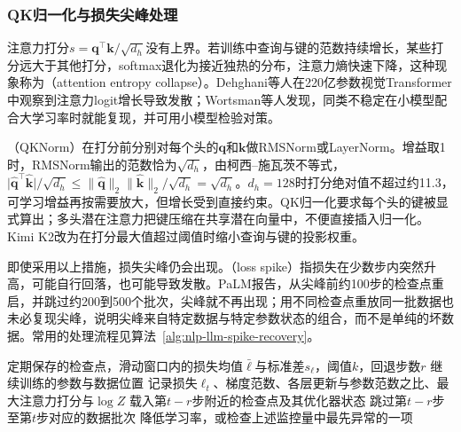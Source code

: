 \subsubsection{QK归一化与损失尖峰处理}
\label{sec:nlp-llm-qknorm-spikes}

注意力打分$s=\bm q^{\top}\bm k/\sqrt{d_h}$没有上界。若训练中查询与键的范数持续增长，某些打分远大于其他打分，softmax退化为接近独热的分布，注意力熵快速下降，这种现象称为（attention entropy collapse）。Dehghani等人在220亿参数视觉Transformer中观察到注意力logit增长导致发散；Wortsman等人发现，同类不稳定在小模型配合大学习率时就能复现，并可用小模型检验对策。

（QKNorm）在打分前分别对每个头的$\bm q$和$\bm k$做RMSNorm或LayerNorm。增益取1时，RMSNorm输出的范数恰为$\sqrt{d_h}$，由柯西--施瓦茨不等式，$\lvert\hat{\bm q}^{\top}\hat{\bm k}\rvert/\sqrt{d_h}\leq\lVert\hat{\bm q}\rVert_2\lVert\hat{\bm k}\rVert_2/\sqrt{d_h}=\sqrt{d_h}$。$d_h=128$时打分绝对值不超过约11.3，可学习增益再按需要放大，但增长受到直接约束。QK归一化要求每个头的键被显式算出；多头潜在注意力把键压缩在共享潜在向量中，不便直接插入归一化。Kimi K2改为在打分最大值超过阈值时缩小查询与键的投影权重。

即使采用以上措施，损失尖峰仍会出现。（loss spike）指损失在少数步内突然升高，可能自行回落，也可能导致发散。PaLM报告，从尖峰前约100步的检查点重启，并跳过约200到500个批次，尖峰就不再出现；用不同检查点重放同一批数据也未必复现尖峰，说明尖峰来自特定数据与特定参数状态的组合，而不是单纯的坏数据。常用的处理流程见算法~\ref{alg:nlp-llm-spike-recovery}。

\begin{algorithm}[损失尖峰的监控与回滚]
  \label{alg:nlp-llm-spike-recovery}
  \begin{algorithmic}[1]
    \Require 定期保存的检查点，滑动窗口内的损失均值$\bar\ell$与标准差$s_\ell$，阈值$k$，回退步数$r$
    \Ensure 继续训练的参数与数据位置
      \State 记录损失$\ell_t$、梯度范数、各层更新与参数范数之比、最大注意力打分与$\log Z$
        \State 载入第$t-r$步附近的检查点及其优化器状态
        \State 跳过第$t-r$步至第$t$步对应的数据批次
          \State 降低学习率，或检查上述监控量中最先异常的一项
        \EndIf
      \EndIf
    \EndFor
  \end{algorithmic}
\end{algorithm}

